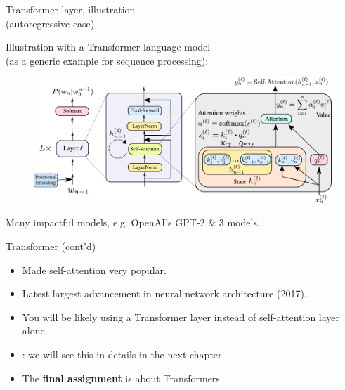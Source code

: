 \begin{frame}{Transformer layer, illustration\\ (autoregressive case)}

Illustration with a Transformer language model\\ (as a generic example for sequence processing):

\begin{figure}
\hspace{-10mm}
                        \centering
                        \includegraphics[width=.9\linewidth]{./figures/trafo_lm.pdf}
\end{figure}
Many impactful models, e.g. OpenAI's GPT-2 \& 3 models.
\end{frame}

\begin{frame}{Transformer (cont'd)}
\begin{itemize}
\item Made self-attention very popular.
\item Latest largest advancement in neural network architecture (2017).
\item You will be likely using a Transformer layer instead of self-attention layer alone.
\item {}: we will see this in details in the next chapter
\item The \textbf{final assignment} is about Transformers.
\end{itemize}
\end{frame}


